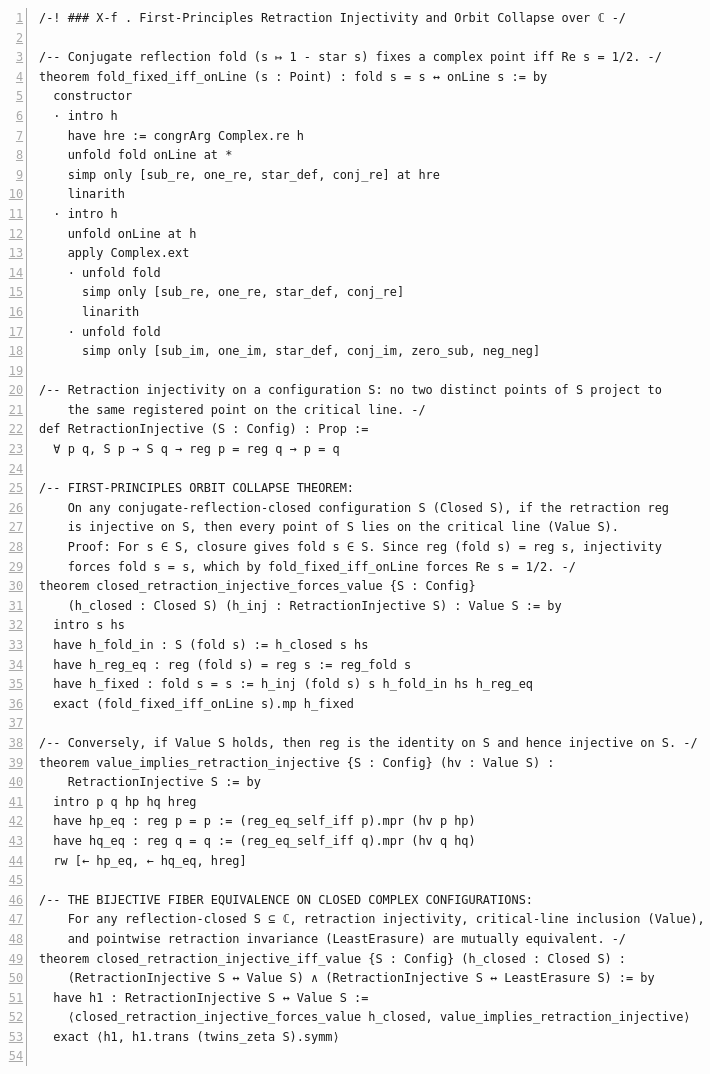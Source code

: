 \documentclass[10pt]{article}
\newcommand{\leansize}{\fontsize{5.5pt}{6.75pt}\selectfont}
\begin{document}
\begin{multicols}{2}
\begin{Verbatim}[numbers=left,firstnumber=1,numbersep=3pt,xleftmargin=2.6em,breaklines=true,breakanywhere=true,breakautoindent=false,breakindent=1.4em,breaksymbolleft={},breakanywheresymbolpre={},fontsize=\leansize]
/-! ### X-f . First-Principles Retraction Injectivity and Orbit Collapse over ℂ -/

/-- Conjugate reflection fold (s ↦ 1 - star s) fixes a complex point iff Re s = 1/2. -/
theorem fold_fixed_iff_onLine (s : Point) : fold s = s ↔ onLine s := by
  constructor
  · intro h
    have hre := congrArg Complex.re h
    unfold fold onLine at *
    simp only [sub_re, one_re, star_def, conj_re] at hre
    linarith
  · intro h
    unfold onLine at h
    apply Complex.ext
    · unfold fold
      simp only [sub_re, one_re, star_def, conj_re]
      linarith
    · unfold fold
      simp only [sub_im, one_im, star_def, conj_im, zero_sub, neg_neg]

/-- Retraction injectivity on a configuration S: no two distinct points of S project to
    the same registered point on the critical line. -/
def RetractionInjective (S : Config) : Prop :=
  ∀ p q, S p → S q → reg p = reg q → p = q

/-- FIRST-PRINCIPLES ORBIT COLLAPSE THEOREM:
    On any conjugate-reflection-closed configuration S (Closed S), if the retraction reg
    is injective on S, then every point of S lies on the critical line (Value S).
    Proof: For s ∈ S, closure gives fold s ∈ S. Since reg (fold s) = reg s, injectivity
    forces fold s = s, which by fold_fixed_iff_onLine forces Re s = 1/2. -/
theorem closed_retraction_injective_forces_value {S : Config}
    (h_closed : Closed S) (h_inj : RetractionInjective S) : Value S := by
  intro s hs
  have h_fold_in : S (fold s) := h_closed s hs
  have h_reg_eq : reg (fold s) = reg s := reg_fold s
  have h_fixed : fold s = s := h_inj (fold s) s h_fold_in hs h_reg_eq
  exact (fold_fixed_iff_onLine s).mp h_fixed

/-- Conversely, if Value S holds, then reg is the identity on S and hence injective on S. -/
theorem value_implies_retraction_injective {S : Config} (hv : Value S) :
    RetractionInjective S := by
  intro p q hp hq hreg
  have hp_eq : reg p = p := (reg_eq_self_iff p).mpr (hv p hp)
  have hq_eq : reg q = q := (reg_eq_self_iff q).mpr (hv q hq)
  rw [← hp_eq, ← hq_eq, hreg]

/-- THE BIJECTIVE FIBER EQUIVALENCE ON CLOSED COMPLEX CONFIGURATIONS:
    For any reflection-closed S ⊆ ℂ, retraction injectivity, critical-line inclusion (Value),
    and pointwise retraction invariance (LeastErasure) are mutually equivalent. -/
theorem closed_retraction_injective_iff_value {S : Config} (h_closed : Closed S) :
    (RetractionInjective S ↔ Value S) ∧ (RetractionInjective S ↔ LeastErasure S) := by
  have h1 : RetractionInjective S ↔ Value S :=
    ⟨closed_retraction_injective_forces_value h_closed, value_implies_retraction_injective⟩
  exact ⟨h1, h1.trans (twins_zeta S).symm⟩


\end{Verbatim}
\end{multicols}
\end{document}
